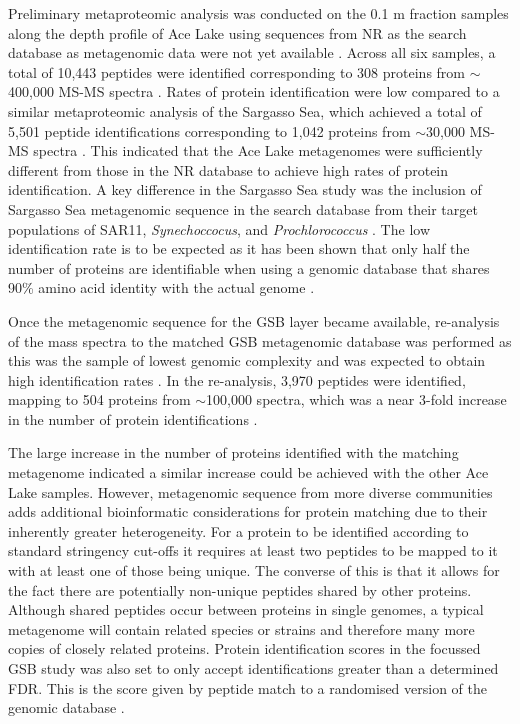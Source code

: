 Preliminary metaproteomic analysis was conducted on the 0.1 \textmu{}m fraction samples along the depth profile of Ace Lake using sequences from \ac{NR} as the search database as metagenomic data were not yet available \cite{Ng2010b}.
Across all six samples, a total of 10,443 peptides were identified corresponding to 308 proteins from $\sim$400,000 \ac{MS-MS} spectra \cite{Ng2010b}.
Rates of protein identification were low compared to a similar metaproteomic analysis of the Sargasso Sea, which achieved  a total of 5,501 peptide identifications corresponding to 1,042 proteins from $\sim$30,000 \ac{MS-MS} spectra \cite{Sowell2009}. 
This indicated that the Ace Lake metagenomes were sufficiently different from those in the \ac{NR} database to achieve high rates of protein identification.
A key difference in the Sargasso Sea study was the inclusion of Sargasso Sea metagenomic sequence in the search database from their target populations of SAR11, \emph{Synechoccocus}, and \emph{Prochlorococcus} \cite{Sowell2009}.
The low identification rate is to be expected as it has been shown that only half the number of proteins are identifiable when using a genomic database that shares 90\% amino acid identity with the actual genome \cite{Denef2007}.

Once the metagenomic sequence for the \ac{GSB} layer became available, re-analysis of the mass spectra to the matched \ac{GSB} metagenomic database was performed as this was the sample of lowest genomic complexity and was expected to obtain high identification rates \cite{Ng2010a, Ng2010b}.
In the re-analysis, 3,970 peptides were identified, mapping to 504 proteins from $\sim$100,000 spectra, which was a near 3-fold increase in the number of protein identifications \cite{Ng2010a, Ng2010b}.

The large increase in the number of proteins identified with the matching metagenome indicated a similar increase could be achieved with the other Ace Lake samples.
However, metagenomic sequence from more diverse communities adds additional bioinformatic considerations for protein matching due to their inherently greater heterogeneity.
For a protein to be identified according to standard stringency cut-offs it requires at least two peptides to be mapped to it with at least one of those being unique. 
The converse of this is that it allows for the fact there are potentially non-unique peptides shared by other proteins.
Although shared peptides occur between proteins in single genomes, a typical metagenome will contain related species or strains and therefore many more copies of closely related proteins.
Protein identification scores in the focussed \ac{GSB} study was also set to only accept identifications greater than a determined \ac{FDR}.
This is the score given by peptide match to a randomised version of the genomic database \cite{Ng2010a, Ng2010b}.

